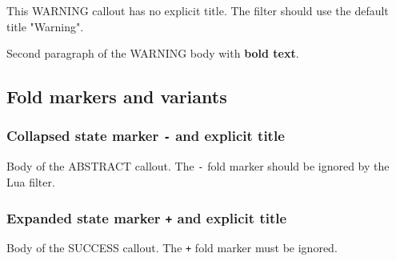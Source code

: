\begin{tcolorbox}[breakable,colback=ocOrgBack,colframe=ocOrgFrame,coltitle=ocOrgTitle,left=3mm,boxed title style={left=1mm},title={\hspace*{-2.5mm}\iconWarning\; Warning}]

This WARNING callout has no explicit title. The filter should use the
default title "Warning".

Second paragraph of the WARNING body with \textbf{bold text}.

\end{tcolorbox}

\subsection{Fold markers and variants}\label{fold-markers-and-variants}

\subsubsection{\texorpdfstring{Collapsed state marker \texttt{-} and
explicit
title}{Collapsed state marker - and explicit title}}\label{collapsed-state-marker---and-explicit-title}

\begin{tcolorbox}[breakable,colback=ocGryBack,colframe=ocGryFrame,coltitle=ocGryTitle,left=3mm,boxed title style={left=1mm},title={\hspace*{-2.5mm}\iconTldr\; Abstract with fold marker}]

Body of the ABSTRACT callout. The \texttt{-} fold marker should be
ignored by the Lua filter.

\end{tcolorbox}

\subsubsection{\texorpdfstring{Expanded state marker \texttt{+} and
explicit
title}{Expanded state marker + and explicit title}}\label{expanded-state-marker-and-explicit-title}

\begin{tcolorbox}[breakable,colback=ocGreBack,colframe=ocGreFrame,coltitle=ocGreTitle,left=3mm,boxed title style={left=1mm},title={\hspace*{-2.5mm}\iconCheck\; Title with plus marker}]

Body of the SUCCESS callout. The \texttt{+} fold marker must be ignored.

\end{tcolorbox}

